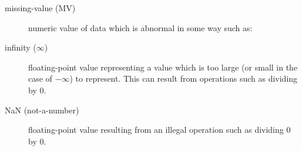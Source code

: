     \begin{description}
      \item[missing-value (MV)]
      numeric value of data which is abnormal in some way such as:
      \item[infinity ($\infty$)]
      floating-point value representing a value which is too
          large (or small in the case of $-\infty$) to
          represent. This can result from operations such as dividing
          by 0.
      \item[NaN (not-a-number)]
      floating-point value resulting from an illegal operation
          such as dividing 0 by 0.
    \end{description}
